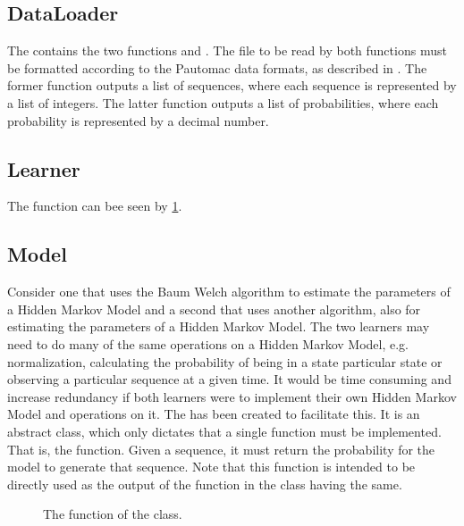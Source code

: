 \subsection{DataLoader}
The  contains the two functions  and . The file to be read by both functions must be formatted according to the Pautomac data formats, as described in . The former function outputs a list of sequences, where each sequence is represented by a list of integers.
The latter function outputs a list of probabilities, where each probability is represented by a decimal number.

\subsection{Learner}
The  function can bee seen by \ref{code:learner}.

\subsection{Model}
Consider one  that uses the Baum Welch algorithm to estimate the parameters of a Hidden Markov Model and a second  that uses another algorithm, also for estimating the parameters of a Hidden Markov Model. The two learners may need to do many of the same operations on a Hidden Markov Model, e.g. normalization, calculating the probability of being in a state particular state or observing a particular sequence at a given time. 
It would be time consuming and increase redundancy if both learners were to implement their own Hidden Markov Model and operations on it.
The  has been created to facilitate this. It is an abstract class, which only dictates that a single function must be implemented. That is, the  function. Given a sequence, it must return the probability for the model to generate that sequence. Note that this function is intended to be directly used as the output of the function in the  class having the same.

\begin{figure}
\caption{The  function of the  class.}
\label{code:learner}
\end{figure}